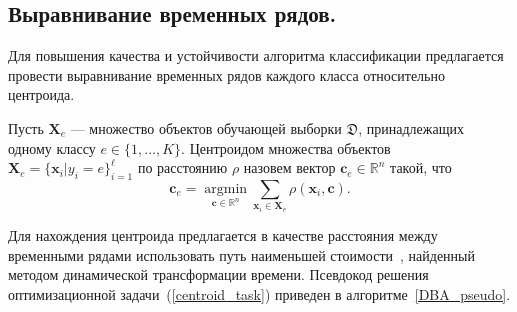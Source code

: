\subsection{Выравнивание временных рядов.}

Для повышения качества и устойчивости алгоритма классификации предлагается провести выравнивание временных рядов каждого класса относительно центроида.

Пусть $\mathbf{X}_e$ --- множество объектов обучающей выборки $\mathfrak{D}$, принадлежащих одному классу $e \in \{1, \dots, K\}$.
Центроидом множества объектов $\mathbf{X}_e = \{\mathbf{x}_i|y_i=e\}_{i=1}^\ell$ по расстоянию $\rho$ назовем вектор $\mathbf{c}_e \in \mathbb{R}^n$ такой, что
\begin{equation}
\label{centroid_task}
\mathbf{c}_e = \mathop{\text{argmin}}\limits_{{\mathbf{c} \in \mathbb{R}^n}}\sum_{\mathbf{x}_i \in \mathbf{X}_e}
{\rho(\mathbf{x}_i ,\mathbf{c})}.
\end{equation}

Для нахождения центроида предлагается в качестве расстояния между временными рядами использовать путь наименьшей стоимости~\cite{goncharov2015cost}, найденный методом динамической трансформации времени.
Псевдокод решения оптимизационной задачи~(\ref{centroid_task}) приведен в алгоритме~\ref{DBA_pseudo}.

